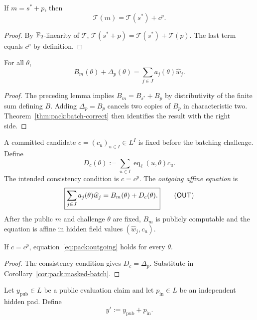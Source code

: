 \begin{lemma}\label{lem:pack:masked-transpose}
If $m=s^*+p$, then
\[
 \boxed{\mathcal T(m)=\mathcal T(s^*)+c^p.}
\]
\end{lemma}
\begin{proof}
By $\mathbb{F}_2$-linearity of $\mathcal T$,
$\mathcal T(s^*+p)=\mathcal T(s^*)+\mathcal T(p)$.
The last term equals $c^p$ by definition.
\end{proof}

\begin{corollary}\label{cor:pack:masked-batch}
For all $\theta$,
\[
 \boxed{B_m(\theta)+\Delta_p(\theta)
       =\sum_{j\in J}a_j(\theta)\widehat w_j.}
\]
\end{corollary}
\begin{proof}
The preceding lemma implies
$B_m=B_{s^*}+B_p$ by distributivity of the
finite sum defining $B$. Adding
$\Delta_p=B_p$ cancels two copies of $B_p$
in characteristic two. Theorem~\ref{thm:pack:batch-correct}
then identifies the result with the right side.
\end{proof}

\begin{definition}\label{def:pack:candidate-c}
A committed candidate $c=(c_u)_{u\in I}\in L^I$
is fixed before the batching challenge. Define
\[
 D_c(\theta):=\sum_{u\in I}
       \operatorname{eq}_\ell(u,\theta)c_u.
\]
The intended consistency condition is $c=c^p$.
The \emph{outgoing affine equation} is
\[
 \boxed{
 \sum_{j\in J}a_j(\theta)\widehat w_j
       =B_m(\theta)+D_c(\theta).
 }\tag{$\mathsf{OUT}$}\label{eq:pack:outgoing}
\]
After the public $m$ and challenge $\theta$ are fixed,
$B_m$ is publicly computable and the equation is
affine in hidden field values $(\widehat w_j,c_u)$.
\end{definition}

\begin{lemma}\label{lem:pack:outgoing-honest}
If $c=c^p$, equation~\eqref{eq:pack:outgoing}
holds for every $\theta$.
\end{lemma}
\begin{proof}
The consistency condition gives $D_c=\Delta_p$.
Substitute in Corollary~\ref{cor:pack:masked-batch}.
\end{proof}

\begin{definition}\label{def:pack:incoming}
Let $y_{\mathrm{pub}}\in L$ be a public evaluation
claim and let $p_{\mathrm{in}}\in L$ be an independent
hidden pad. Define
\[
 y':=y_{\mathrm{pub}}+p_{\mathrm{in}}.
\]
\end{definition}

